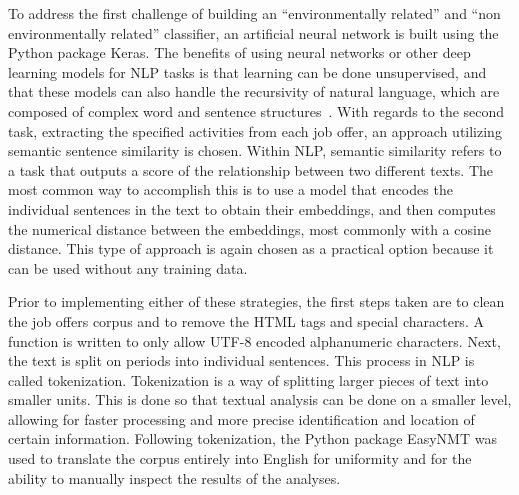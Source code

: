 To address the first challenge of building an “environmentally related” and “non environmentally related” classifier, an artificial neural network is built using the Python package Keras. The benefits of using neural networks or other deep learning models for NLP tasks is that learning can be done unsupervised, and that these models can also handle the recursivity of natural language, which are composed of complex word and sentence structures~\cite{10.5555/3208611}. With regards to the second task, extracting the specified activities from each job offer, an approach utilizing semantic sentence similarity is chosen. Within NLP, semantic similarity refers to a task that outputs a score of the relationship between two different texts. The most common way to accomplish this is to use a model that encodes the individual sentences in the text to obtain their embeddings, and then computes the numerical distance between the embeddings, most commonly with a cosine distance. This type of approach is again chosen as a practical option because it can be used without any training data.

Prior to implementing either of these strategies, the first steps taken are to clean the job offers corpus and to remove the HTML tags and special characters. A function is written to only allow UTF-8 encoded alphanumeric characters. Next, the text is split on periods into individual sentences. This process in NLP is called tokenization. Tokenization is a way of splitting larger pieces of text into smaller units. This is done so that textual analysis can be done on a smaller level, allowing for faster processing and more precise identification and location of certain information. Following tokenization, the Python package EasyNMT was used to translate the corpus entirely into English for uniformity and for the ability to manually inspect the results of the analyses. 
